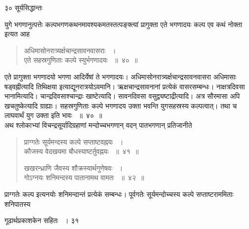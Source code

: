\documentclass[11pt, openany]{book}
\begin{document}
\newpage

\noindent ३० \hspace{4cm} सूर्यसिद्धान्तः
\vspace{1cm}

\begin{sloppypar}
\noindent युगे भगणानुत्पत्तेः कल्पभगणकथनमावश्यकमतस्तत्पङ्क्त्यां प्रागुक्ता एते भगणादयः कल्प एव कथं नोक्ता इत्यत आह\textendash
\end{sloppypar}
\begin{quote}
 
  {\ssi अधिमासोनरात्र्यर्क्षचान्द्रसावनवासराः ~।\\
एते सहस्रगुणिताः कल्पे स्युर्भगणादयः ~॥~४०~॥}
\end{quote}
\begin{sloppypar}
 एते प्रागुक्ता भगणादयो भगणा आदिर्येषां ते भगणादयः। अधिमासोनरात्र्यर्क्षचान्द्रसावनवासरा अधिमासाः षड्वह्नीत्यादि तिथिक्षया इत्याद्यूनरात्रयोऽवमानि। ऋक्षचान्द्रसावनानां प्रत्येकं वासरसम्बन्धः। नाक्षत्रदिवसा भानामित्यादि। चान्द्रदिवसाश्चान्द्राः खाष्टेत्यादि। सावनदिवसा वसुद्व्यष्टाद्रीत्यादि। अत्र सौरमासा अपि खचतुष्केत्यादि ग्राह्याः। सहस्रगुणिताः कल्पे भगणादय उक्ता भवन्ति युगसहस्रस्य कल्पत्वात्। तथा च लाघवार्थं युग उक्ता इति भावः ~॥~४०~॥\\
 \noindent अथ श्लोकाभ्यां विचन्द्रसूर्यादिग्रहाणां मन्दोच्चभगणान् वदन् पातभगणान् प्रतिजानीते\textendash
\end{sloppypar}
\begin{quote}
 
  {\ssi प्राग्गतेः सूर्यमन्दस्य कल्पे सप्ताष्टवह्नयः ~।\\
कौजस्य वेदखयमा बौधस्याष्टर्तुवह्नयः ~॥~४१~॥

खखरन्ध्राणि जैवस्य शौक्रस्यार्थगुणेषवः ~।\\
गोऽग्नयः शनिमन्दस्य पातानामथ वामतः ~॥~४२~॥}
\end{quote}
\begin{sloppypar}
 प्राग्गतेः कल्प इत्यनयोः शनिमन्दान्तं प्रत्येकं सम्बन्धः। पूर्वगतेः सूर्यमन्दोच्चस्य कल्पे सप्ताष्टराममिताः शनिपातस्य
\end{sloppypar}

\newpage

\hspace{3cm} गूढार्थप्रकाशकेन सहितः ~। \hfill ३१
\vspace{1cm}
\end{document}
